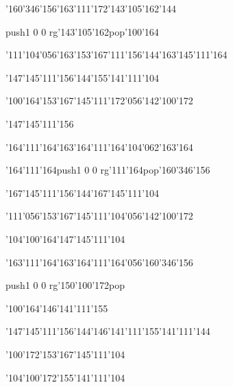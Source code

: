 \null\vfill\ipa\centerline{\enskip\char'160\char'346\char'156\enskip\enskip\enskip\enskip\enskip\char'163\char'111\char'172\enskip\char'143\char'105\char'162\char'144}\medskip\centerline{\enskip\pdfcolorstack\match push{1 0 0 rg}\char'143\char'105\char'162\pdfcolorstack\match pop{}\enskip\char'100\char'164\enskip\enskip\enskip\enskip\enskip\enskip\enskip\enskip}\medskip\centerline{\enskip\char'111\char'104\char'056\char'163\char'153\char'167\char'111\char'156\char'144\enskip\enskip\enskip\enskip\enskip\char'163\char'145\char'111\char'164}\medskip\centerline{\enskip\enskip\enskip\enskip\char'147\char'145\char'111\char'156\char'144\enskip\enskip\enskip\enskip\enskip\char'155\char'141\char'111\char'104}\medskip\centerline{\enskip\char'100\char'164\enskip\enskip\enskip\enskip\char'153\char'167\char'145\char'111\char'172\char'056\char'142\char'100\char'172}\medskip\centerline{\enskip\enskip\enskip\enskip\enskip\enskip\enskip\enskip\char'147\char'145\char'111\char'156}\medskip\vfill\footline{\hfil\tt\folio\hfil}\eject
\null\vfill\ipa\centerline{\enskip\char'164\char'111\char'164\enskip\char'163\char'164\char'111\char'164\enskip\enskip\enskip\enskip\enskip\char'104\char'062\char'163\char'164}\medskip\centerline{\enskip\char'164\char'111\char'164\enskip\pdfcolorstack\match push{1 0 0 rg}\char'111\char'164\pdfcolorstack\match pop{}\enskip\enskip\enskip\enskip\enskip\char'160\char'346\char'156}\medskip\centerline{\enskip\enskip\enskip\enskip\enskip\enskip\enskip\enskip\enskip\enskip\enskip\enskip\enskip\enskip\enskip\enskip\enskip\enskip}\medskip\centerline{\enskip\enskip\enskip\enskip\char'167\char'145\char'111\char'156\char'144\enskip\enskip\enskip\enskip\enskip\char'167\char'145\char'111\char'104}\medskip\centerline{\enskip\enskip\enskip\enskip\enskip\enskip\char'111\char'056\char'153\char'167\char'145\char'111\char'104\char'056\char'142\char'100\char'172}\medskip\centerline{\enskip\char'104\char'100\char'164\enskip\enskip\enskip\enskip\char'147\char'145\char'111\char'104}\medskip\vfill\footline{\hfil\tt\folio\hfil}\eject
\null\vfill\ipa\centerline{\enskip\char'163\char'111\char'164\enskip\char'163\char'164\char'111\char'164\char'056\char'160\char'346\char'156\enskip\enskip\enskip\enskip\enskip}\medskip\centerline{\enskip\enskip\enskip\enskip\enskip\enskip\enskip\enskip\pdfcolorstack\match push{1 0 0 rg}\char'150\char'100\char'172\pdfcolorstack\match pop{}\enskip\enskip\enskip\enskip}\medskip\centerline{\enskip\char'100\char'164\enskip\enskip\enskip\enskip\enskip\enskip\enskip\enskip\enskip\enskip\enskip\enskip\char'146\char'141\char'111\char'155}\medskip\centerline{\enskip\enskip\enskip\enskip\char'147\char'145\char'111\char'156\char'144\enskip\char'146\char'141\char'111\enskip\char'155\char'141\char'111\char'144}\medskip\centerline{\enskip\char'100\char'172\enskip\enskip\enskip\enskip\char'153\char'167\char'145\char'111\char'104\enskip\enskip\enskip\enskip}\medskip\centerline{\enskip\char'104\char'100\char'172\enskip\enskip\enskip\enskip\char'155\char'141\char'111\char'104}\medskip\vfill\footline{\hfil\tt\folio\hfil}\eject
